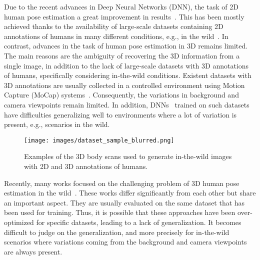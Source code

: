\documentclass{article}
\begin{document}
Due to the recent advances in Deep Neural Networks (DNN), the task of 2D human pose estimation a great improvement in results~\cite{chu2017multi,cao2018openpose,newell2016stacked}. This has been mostly achieved thanks to the availability of large-scale datasets containing 2D annotations of humans in many different conditions, e.g., in the wild~\cite{andriluka20142d}. In contrast, advances in the task of human pose estimation in 3D remains limited. The main reasons are the ambiguity of recovering the 3D information from a single image, in addition to the lack of large-scale datasets with 3D annotations of humans, specifically considering in-the-wild conditions. Existent datasets with 3D annotations are usually collected in a controlled environment using Motion Capture (MoCap) systems~\cite{h36m_pami}. Consequently, the variations in background and camera viewpoints remain limited. In addition, DNNs~\cite{zhou2016deep} trained on such datasets have difficulties generalizing well to environments where a lot of variation is present, e.g., scenarios in the wild. 

\begin{figure}[t]
\centering
    \texttt{[image: images/dataset\_sample\_blurred.png]}
    \caption{Examples of the 3D body scans used to generate in-the-wild images with 2D and 3D annotations of humans.}
    \label{fig:samples_dataset}
    \vspace{-0.35cm}
\end{figure}

Recently, many works focused on the challenging problem of 3D human pose estimation in the wild~\cite{zhou2017towards,yang20183d,pavllo20193d,rogez2019lcr}. These works differ significantly from each other but share an important aspect. They are usually evaluated on the same dataset that has been used for training. Thus, it is possible that these approaches have been over-optimized for specific datasets, leading to a lack of generalization. It becomes difficult to judge on the generalization, and more precisely for in-the-wild scenarios where variations coming from the background and camera viewpoints are always present.
\end{document}
